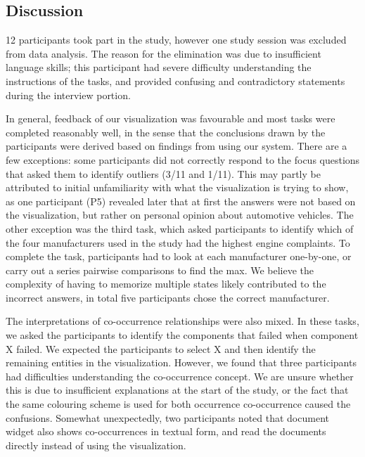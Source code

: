 \subsection{Discussion}
12 participants took part in the study, however one study session was excluded
from data analysis. The reason for the elimination was due to insufficient language skills; 
this participant had severe difficulty understanding the instructions of the tasks, 
and provided confusing and contradictory statements during the interview portion.



In general, feedback of our visualization was favourable and most tasks were
completed reasonably well, in the sense that the conclusions drawn by the
participants were derived based on findings from using our system. There are a
few exceptions: some participants did not correctly respond to the focus
questions that asked them to identify outliers (3/11 and 1/11). This may partly
be attributed to initial unfamiliarity with what the visualization is trying to
show, as one participant (P5) revealed later that at first the answers were not
based on the visualization, but rather on personal opinion about automotive
vehicles. The other exception was the third task, which asked participants to identify
which of the four manufacturers used in the study had the highest engine
complaints. To complete the task, participants had to look at each
manufacturer one-by-one, or carry out a series pairwise comparisons to find the
max. We believe the complexity of having to memorize multiple states likely
contributed to the incorrect answers, in total five participants chose the correct
manufacturer. 

The interpretations of co-occurrence relationships were also mixed. In these
tasks, we asked the participants to identify the components that failed when
component X failed. We expected the participants to select X and then identify
the remaining entities in the visualization. However, we found that three participants
had difficulties understanding the co-occurrence concept. We are unsure whether
this is due to insufficient explanations at the start of the study, or the fact
that the same colouring scheme is used for both occurrence co-occurrence caused
the confusions. Somewhat unexpectedly, two participants noted that document
widget also shows co-occurrences in textual form, and read the documents
directly instead of using the \threed visualization.

